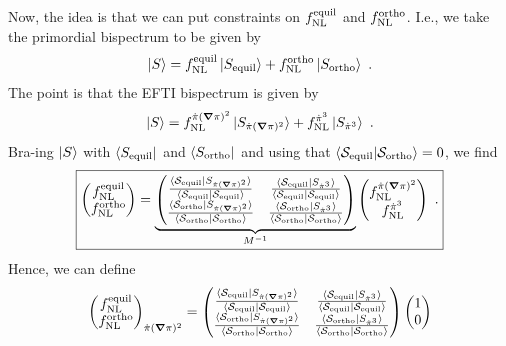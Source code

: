 \documentclass[aps,prd,amsmath,floats,floatfix,superscriptaddress,nofootinbib%
]{revtex4}%
\renewcommand\({\left(}
\renewcommand\){\right)}
\renewcommand\[{\left[}
\renewcommand\]{\right]}
\renewcommand{\vec}{\bm}
\begin{document}
Now, the idea is that we can put constraints on $f_{\rm NL}^{\rm equil}$ and $f_{\rm NL}^{\rm ortho}$. I.e., we take the primordial bispectrum to be given by 
\begin{equation}
\ket{S} = f_{\rm NL}^{\rm equil}\ket{S_{\rm equil}} + f_{\rm NL}^{\rm ortho}\ket{S_{\rm ortho}}\,\,. 
\end{equation} 
The point is that the EFTI bispectrum is given by 
\begin{equation}
\ket{S} = f_{\rm NL}^{\dot{\pi}(\vec{\nabla}\pi)^2}\ket{S_{\dot{\pi}(\vec{\nabla}\pi)^2}} + f_{\rm NL}^{\dot{\pi}^3}\ket{S_{\dot{\pi}^3}}\,\,. 
\end{equation} 
Bra-ing $\ket{S}$ with $\bra{S_{\rm equil}}$ and $\bra{S_{\rm ortho}}$ and using that $\braket{{\cal S}_{\rm equil}|{\cal S}_{\rm ortho}}=0$, we find 
\begin{equation}
\boxed{\begin{pmatrix}
f_{\rm NL}^{\rm equil} \\
f_{\rm NL}^{\rm ortho}
\end{pmatrix}
 = {\underbrace{\begin{pmatrix}
\frac{\braket{{\cal S}_{\rm equil}|S_{\dot{\pi}(\vec{\nabla}\pi)^2}}}{\braket{{\cal S}_{\rm equil}|{\cal S}_{\rm equil}}} & \frac{\braket{{\cal S}_{\rm equil}|S_{\dot{\pi}^3}}}{\braket{{\cal S}_{\rm equil}|{\cal S}_{\rm equil}}} \\
\frac{\braket{{\cal S}_{\rm ortho}|S_{\dot{\pi}(\vec{\nabla}\pi)^2}}}{\braket{{\cal S}_{\rm ortho}|{\cal S}_{\rm ortho}}} & \frac{\braket{{\cal S}_{\rm ortho}|S_{\dot{\pi}^3}}}{\braket{{\cal S}_{\rm ortho}|{\cal S}_{\rm ortho}}}
\end{pmatrix}}_{{M}^{-1}}}
\begin{pmatrix}
f_{\rm NL}^{\dot{\pi}(\vec{\nabla}\pi)^2} \\
f_{\rm NL}^{\dot{\pi}^3}
\end{pmatrix}\,\,.} 
\end{equation} 
Hence, we can define 
\begin{equation}
\begin{pmatrix}
f_{\rm NL}^{\rm equil} \\
f_{\rm NL}^{\rm ortho}
\end{pmatrix}_{\dot{\pi}(\vec{\nabla}\pi)^2}
 = \begin{pmatrix}
\frac{\braket{{\cal S}_{\rm equil}|S_{\dot{\pi}(\vec{\nabla}\pi)^2}}}{\braket{{\cal S}_{\rm equil}|{\cal S}_{\rm equil}}} & \frac{\braket{{\cal S}_{\rm equil}|S_{\dot{\pi}^3}}}{\braket{{\cal S}_{\rm equil}|{\cal S}_{\rm equil}}} \\
\frac{\braket{{\cal S}_{\rm ortho}|S_{\dot{\pi}(\vec{\nabla}\pi)^2}}}{\braket{{\cal S}_{\rm ortho}|{\cal S}_{\rm ortho}}} & \frac{\braket{{\cal S}_{\rm ortho}|S_{\dot{\pi}^3}}}{\braket{{\cal S}_{\rm ortho}|{\cal S}_{\rm ortho}}}
\end{pmatrix}
\begin{pmatrix}
1 \\
0
\end{pmatrix} %
\end{equation} 
\end{document}
